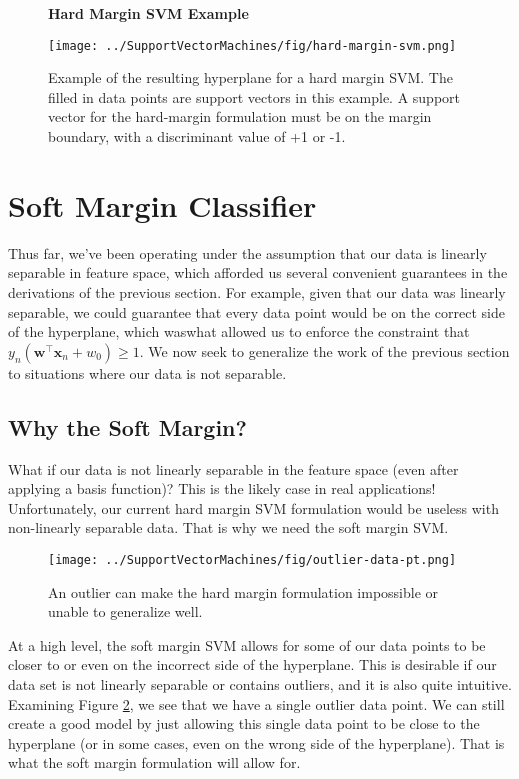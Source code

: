 
\begin{figure}
    \centering
    \textbf{Hard Margin SVM Example}\par\medskip
    \texttt{[image: ../SupportVectorMachines/fig/hard-margin-svm.png]}
    \caption{Example of the resulting hyperplane for a hard margin SVM. The filled in data points are
      support vectors in this example. A support vector for the hard-margin formulation must be on the margin boundary, with a discriminant value of +1 or -1.}
    \label{fig:hard-margin-svm}
\end{figure}

\section{Soft Margin Classifier}

Thus far, we've been operating under the assumption that our data is linearly separable in feature space, which afforded us several convenient guarantees in the derivations of the previous section. For example, given that our data was linearly separable, we could guarantee that every data point would be on the correct side of the hyperplane, which waswhat allowed us to enforce the constraint that  $y_{n}(\textbf{w}^\top\textbf{x}_{n} + w_{0}) \geq  1$.
We now seek to generalize the work of the previous section to situations where our data is not
separable.

\subsection{Why the Soft Margin?}

What if our data is not linearly separable in the feature space (even after applying a basis function)?
This is the likely case in real applications!   Unfortunately, our current hard margin SVM formulation would be useless with non-linearly separable data. That is why we need the soft margin SVM.

\begin{figure}
    \centering
    \texttt{[image: ../SupportVectorMachines/fig/outlier-data-pt.png]}
    \caption{An outlier can make the hard margin formulation impossible or unable to generalize well.}
    \label{fig:outlier-data-pt}
\end{figure}

At a high level, the soft margin SVM allows for some of our data points to be closer to or even on the incorrect side of the hyperplane. This is desirable if our data set is not linearly separable or contains outliers, and it is also quite intuitive. Examining Figure \ref{fig:outlier-data-pt}, we see that we have a single outlier data point. We can still create a good model by just allowing this single data point to be close to the hyperplane (or in some cases, even on the wrong side of the hyperplane). That is what the soft margin formulation will allow for.

